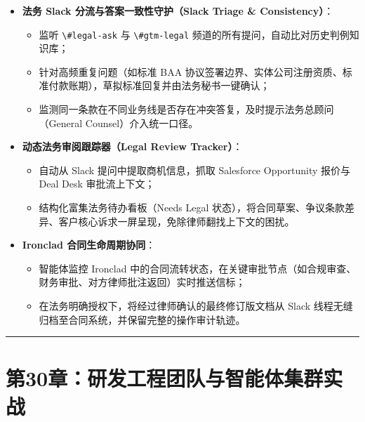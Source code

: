\documentclass[10.5pt,a4paper,oneside]{report}
\providecommand{\tightlist}{\setlength{\itemsep}{0pt}\setlength{\parskip}{0pt}}
\newcommand{\passthrough}[1]{#1}
\begin{document}
\begin{itemize}
\tightlist
\item
  \textbf{法务 Slack 分流与答案一致性守护（Slack Triage \&
  Consistency）}：

  \begin{itemize}
  \tightlist
  \item
    监听 \passthrough{\lstinline!\#legal-ask!} 与
    \passthrough{\lstinline!\#gtm-legal!}
    频道的所有提问，自动比对历史判例知识库；
  \item
    针对高频重复问题（如标准 BAA
    协议签署边界、实体公司注册资质、标准付款账期），草拟标准回复并由法务秘书一键确认；
  \item
    监测同一条款在不同业务线是否存在冲突答复，及时提示法务总顾问（General
    Counsel）介入统一口径。
  \end{itemize}
\item
  \textbf{动态法务审阅跟踪器（Legal Review Tracker）}：

  \begin{itemize}
  \tightlist
  \item
    自动从 Slack 提问中提取商机信息，抓取 Salesforce Opportunity 报价与
    Deal Desk 审批流上下文；
  \item
    结构化富集法务待办看板（Needs Legal
    状态），将合同草案、争议条款差异、客户核心诉求一屏呈现，免除律师翻找上下文的困扰。
  \end{itemize}
\item
  \textbf{Ironclad 合同生命周期协同}：

  \begin{itemize}
  \tightlist
  \item
    智能体监控 Ironclad
    中的合同流转状态，在关键审批节点（如合规审查、财务审批、对方律师批注返回）实时推送信标；
  \item
    在法务明确授权下，将经过律师确认的最终修订版文档从 Slack
    线程无缝归档至合同系统，并保留完整的操作审计轨迹。
  \end{itemize}
\end{itemize}

\begin{center}\rule{0.5\linewidth}{0.5pt}\end{center}

\section{第30章：研发工程团队与智能体集群实战}\label{ux7b2c30ux7ae0ux7814ux53d1ux5de5ux7a0bux56e2ux961fux4e0eux667aux80fdux4f53ux96c6ux7fa4ux5b9eux6218}
\end{document}
